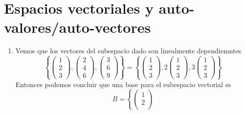 \documentclass[12pt, letterpaper]{article}
\begin{document}
\section{Espacios vectoriales y auto-valores/auto-vectores}
\begin{enumerate}
    \item Vemos que los vectores del subespacio dado son linealmente dependiemntes
    \begin{equation*}
        \left\{
            \begin{pmatrix}
                1 \\
                2 \\
                3
            \end{pmatrix},
            \begin{pmatrix}
                2 \\
                4 \\
                6
            \end{pmatrix},
            \begin{pmatrix}
                3 \\
                6 \\
                9
            \end{pmatrix}
        \right\}
        =
        \left\{
            \begin{pmatrix}
                1 \\
                2 \\
                3
            \end{pmatrix},
            2
            \begin{pmatrix}
                1 \\
                2 \\
                3
            \end{pmatrix},
            3
            \begin{pmatrix}
                1 \\
                2 \\
                3
            \end{pmatrix}
        \right\}
    \end{equation*}
    Entonces podemos concluir que una base para el subespacio vectorial es
    \begin{equation*}
        B =
        \left\{
            \begin{pmatrix}
                1 \\
                2 \\

\end{pmatrix}
\end{equation*}
\end{enumerate}
\end{document}
